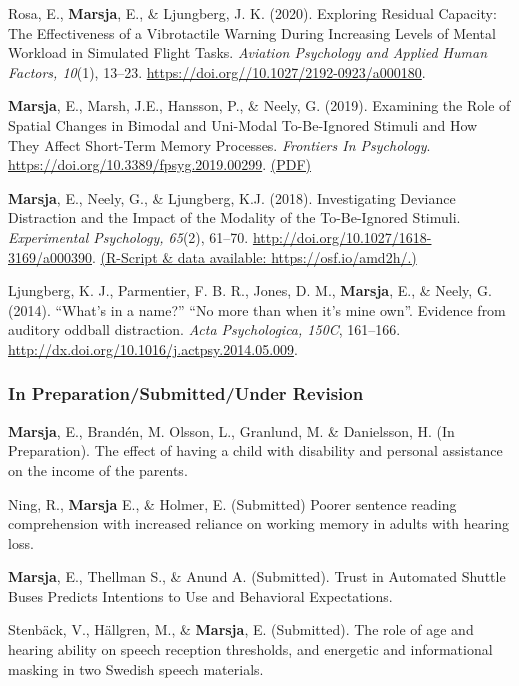 \documentclass[]{article}
\begin{document}
Rosa, E., \textbf{Marsja}, E., \& Ljungberg, J. K. (2020). Exploring
Residual Capacity: The Effectiveness of a Vibrotactile Warning During
Increasing Levels of Mental Workload in Simulated Flight Tasks.
\emph{Aviation Psychology and Applied Human Factors, 10}(1), 13--23.
\url{https://doi.org//10.1027/2192-0923/a000180}.

\textbf{Marsja}, E., Marsh, J.E., Hansson, P., \& Neely, G. (2019).
Examining the Role of Spatial Changes in Bimodal and Uni-Modal
To-Be-Ignored Stimuli and How They Affect Short-Term Memory Processes.
\emph{Frontiers In Psychology}.
\url{https://doi.org/10.3389/fpsyg.2019.00299}.
\href{https://bit.ly/3LkKD19}{(PDF)}

\textbf{Marsja}, E., Neely, G., \& Ljungberg, K.J. (2018). Investigating
Deviance Distraction and the Impact of the Modality of the To-Be-Ignored
Stimuli. \emph{Experimental Psychology, 65}(2), 61--70.
\url{http://doi.org/10.1027/1618-3169/a000390}.
\href{https://osf.io/amd2h/}{(R-Script \& data available:
https://osf.io/amd2h/.)}

Ljungberg, K. J., Parmentier, F. B. R., Jones, D. M., \textbf{Marsja},
E., \& Neely, G. (2014). ``What's in a name?'' ``No more than when it's
mine own''. Evidence from auditory oddball distraction. \emph{Acta
Psychologica, 150C}, 161--166.
\href{http://doi.org/10.1027/1618-3169/a000390}{http://dx.doi.org/10.1016/j.actpsy.2014.05.009}.

\subsubsection{In Preparation/Submitted/Under
Revision}\label{in-preparationsubmittedunder-revision}

\textbf{Marsja}, E., Brandén, M. Olsson, L., Granlund, M. \& Danielsson,
H. (In Preparation). The effect of having a child with disability and
personal assistance on the income of the parents.

Ning, R., \textbf{Marsja} E., \& Holmer, E. (Submitted) Poorer sentence
reading comprehension with increased reliance on working memory in
adults with hearing loss.

\textbf{Marsja}, E., Thellman S., \& Anund A. (Submitted). Trust in
Automated Shuttle Buses Predicts Intentions to Use and Behavioral
Expectations.

Stenbäck, V., Hällgren, M., \& \textbf{Marsja}, E. (Submitted). The role
of age and hearing ability on speech reception thresholds, and energetic
and informational masking in two Swedish speech materials.
\end{document}
